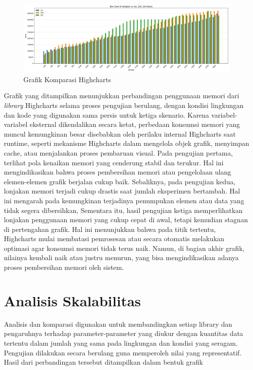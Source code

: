 	\begin{figure}[H]
	\centering
	\includegraphics[width=0.8\linewidth]{gambar/Pembahasan/FIX_Memori/hc.png}
	\caption{Grafik Komparasi Highcharts}
	\label{Grafik Komparasi Highcharts}
\end{figure}

Grafik yang ditampilkan menunjukkan perbandingan penggunaan memori dari \textit{library} Highcharts selama proses pengujian berulang, dengan kondisi lingkungan dan kode yang digunakan sama persis untuk ketiga skenario. Karena variabel-variabel eksternal dikendalikan secara ketat, perbedaan konsumsi memori yang muncul kemungkinan besar disebabkan oleh perilaku internal Highcharts saat runtime, seperti mekanisme Highcharts dalam mengelola objek grafik, menyimpan cache, atau menjalankan proses pembaruan visual.
Pada pengujian pertama, terlihat pola kenaikan memori yang cenderung stabil dan terukur. Hal ini mengindikasikan bahwa proses pembersihan memori atau pengelolaan ulang elemen-elemen grafik berjalan cukup baik. Sebaliknya, pada pengujian kedua, lonjakan memori terjadi cukup drastis saat jumlah eksperimen bertambah. Hal ini mengarah pada kemungkinan terjadinya penumpukan elemen atau data yang tidak segera dibersihkan, Sementara itu, hasil pengujian ketiga memperlihatkan lonjakan penggunaan memori yang cukup cepat di awal, tetapi kemudian stagnan di pertengahan grafik. Hal ini menunjukkan bahwa pada titik tertentu, Highcharts mulai membatasi pemrosesan atau secara otomatis melakukan optimasi agar konsumsi memori tidak terus naik. Namun, di bagian akhir grafik, nilainya kembali naik atau justru menurun, yang bisa mengindikasikan adanya proses pembersihan memori oleh sistem.

\section{Analisis Skalabilitas}
Analisis dan komparasi digunakan untuk membandingkan setiap library dan pengaruhnya terhadap parameter-parameter yang diukur dengan kuantitas data tertentu dalam jumlah yang sama pada lingkungan dan kondisi yang seragam. Pengujian dilakukan secara berulang guna memperoleh nilai yang representatif. Hasil dari perbandingan tersebut ditampilkan dalam bentuk grafik

